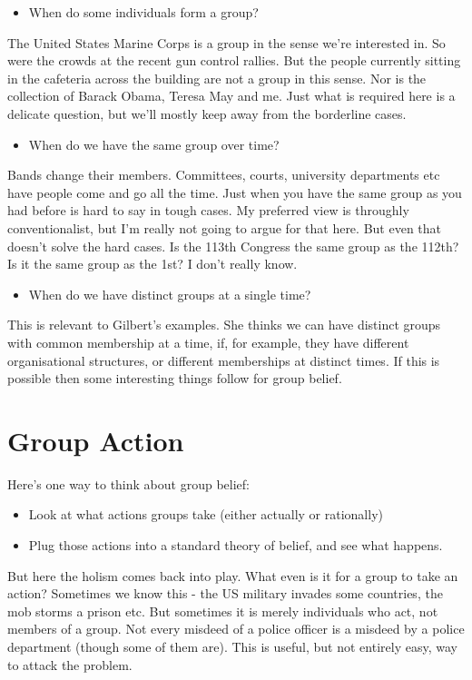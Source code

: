 \begin{itemize}
\item{} When do some individuals form a group?

\end{itemize}
The United States Marine Corps is a group in the sense we're interested in. So were the crowds at the recent gun control rallies. But the people currently sitting in the cafeteria across the building are not a group in this sense. Nor is the collection of Barack Obama, Teresa May and me. Just what is required here is a delicate question, but we'll mostly keep away from the borderline cases.

\begin{itemize}
\item{} When do we have the same group over time?

\end{itemize}
Bands change their members. Committees, courts, university departments etc have people come and go all the time. Just when you have the same group as you had before is hard to say in tough cases. My preferred view is throughly conventionalist, but I'm really not going to argue for that here. But even that doesn't solve the hard cases. Is the 113th Congress the same group as the 112th? Is it the same group as the 1st? I don't really know.

\begin{itemize}
\item{} When do we have distinct groups at a single time?

\end{itemize}
This is relevant to Gilbert's examples. She thinks we can have distinct groups with common membership at a time, if, for example, they have different organisational structures, or different memberships at distinct times. If this is possible then some interesting things follow for group belief.

\section{Group Action}
\label{groupaction}

Here's one way to think about group belief:

\begin{itemize}
\item{} Look at what actions groups take (either actually or rationally)

\item{} Plug those actions into a standard theory of belief, and see what happens.

\end{itemize}
But here the holism comes back into play. What even is it for a group to take an action? Sometimes we know this - the US military invades some countries, the mob storms a prison etc. But sometimes it is merely individuals who act, not members of a group. Not every misdeed of a police officer is a misdeed by a police department (though some of them are). This is useful, but not entirely easy, way to attack the problem.

